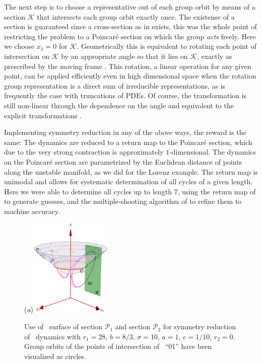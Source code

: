 The next step is to choose a representative out of each group orbit by means of a section $\mathcal{K}$ that intersects each group orbit
exactly once. The existense of a section is guaranteed since a cross-section as in  exists,
this was the whole point of restricting the problem to a Poincar\'e section
on which the group \emph{acts} freely. Here we choose $x_1=0$ for $\mathcal{K}$. Geometrically
this is equivalent to rotating each point of intersection on $\mathcal{K}$ by
an appropriate angle so that it lies on $\mathcal{K}$, exactly as prescribed by
the moving frame . This rotation, a linear operation for any given point,
can be applied efficiently even in high dimensional space when the rotation group representation is a direct
sum of irreducible representations, as is frequently the case with truncations of PDEs.
Of course, the transformation is still non-linear through the dependence on the angle and equivalent
to the explicit transformations .

Implementing symmetry reduction in any of the above ways, the reward is the same: The
dynamics are reduced to a return map to the Poincar\'e section, which due to
the very strong contraction is approximately $1$-dimensional. The dynamics on the Poincar\'e
section are parametrized by the Euclidean distance of points along the unstable manifold, as we did
for the Lorenz example.
The return map is unimodal and allows for systematic determination of all cycles of
a given length. Here we were able to determine all cycles up to length $7$, using
the return map of  to generate guesses, and the multiple-shooting
algorithm of  to refine them to machine accuracy.

\begin{figure}[ht]
\begin{center}
  (\textit{a})\includegraphics[width=0.35\textwidth]{../figs/CLEmartini}
\end{center}
\caption[\CLe\ desymmetrization with double section]{Use of \Poincare\
surface of section $\mathcal{P}_1$ and section $\mathcal{P}_2$ for symmetry
reduction of \CLe\ dynamics with $r_1=28,\, b=8/3,\, \sigma=10,\, a=1$, $e=1/10$, $r_2=0$.
Group orbits of the points of intersection of \rpo\ ``01'' have been visualized as circles.
    }
\label{fig:CLEmartini}
\end{figure}
